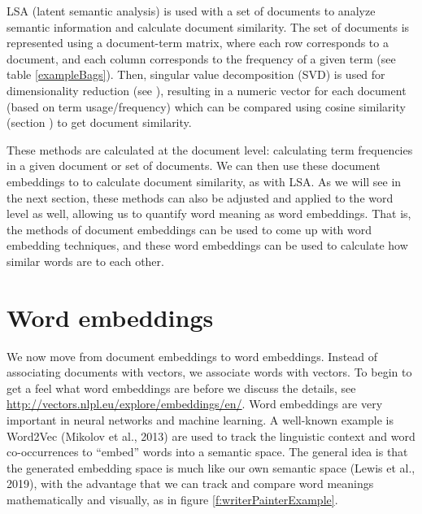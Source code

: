 LSA (latent semantic analysis) is used with a set of documents to analyze semantic information and calculate document similarity. The set of documents is represented using a document-term matrix, where each row corresponds to a document, and each column corresponds to the frequency of a given term (see table \ref{exampleBags}). Then, singular value decomposition (SVD) is used for dimensionality reduction (see ), resulting in a numeric vector for each document (based on term usage/frequency) which can be compared using cosine similarity (section ) to get document similarity.

These methods are calculated at the document level: calculating term frequencies in a given document or set of documents. We can then use these document embeddings to to calculate document similarity, as with LSA.
As we will see in the next section, these methods can also be adjusted and applied to the word level as well, allowing us to quantify word meaning as word embeddings. That is, the methods of document embeddings can be used to come up with word embedding techniques, and these word embeddings can be used to calculate how similar words are to each other.

\section{Word embeddings}

We now move from document embeddings to word embeddings.  Instead of associating documents with vectors, we associate words with vectors. To begin to get a feel what word embeddings are before we discuss the details, see \url{http://vectors.nlpl.eu/explore/embeddings/en/}. Word embeddings are very important in neural networks and machine learning. A well-known example is Word2Vec (Mikolov et al., 2013) are used to track the linguistic context and word co-occurrences to ``embed'' words into a semantic space. The general idea is that the generated embedding space is much like our own semantic space (Lewis et al., 2019), with the advantage that we can track and compare word meanings mathematically and visually, as in figure \ref{f:writerPainterExample}. 

